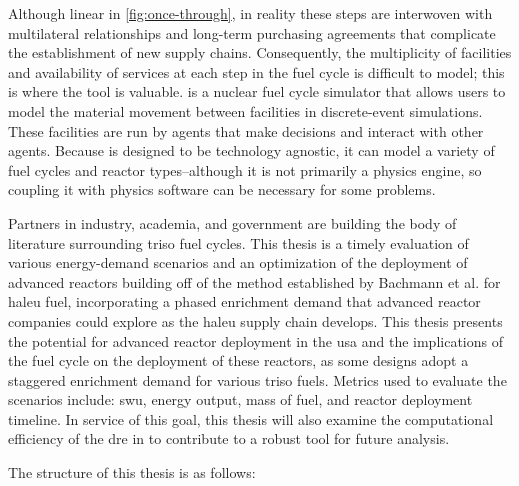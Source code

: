 
Although linear in \ref{fig:once-through}, in reality these steps are
interwoven with multilateral relationships and long-term purchasing agreements
that complicate the establishment of new supply chains. Consequently, the
multiplicity of facilities and availability of services at each step in the
fuel cycle is difficult to model; this is where the \cyclus
\cite{huff_cyclus_intro_2016} tool is valuable. \cyclus is a nuclear fuel cycle
simulator that allows users to model the material movement between facilities
in discrete-event simulations. These facilities are run by agents that make
decisions and interact with other agents. Because \cyclus is designed to be
technology agnostic, it can model a variety of fuel cycles and reactor
types--although it is not primarily a physics engine, so coupling it with
physics software can be necessary for some problems.

Partners in industry, academia, and government are building the body of
literature surrounding \gls{triso} fuel cycles. This thesis is a timely
evaluation of various energy-demand scenarios and an optimization of the
deployment of advanced reactors building off of the method established by
Bachmann et al. \cite{bachmann_enrichment_2021} for \gls{haleu} fuel,
incorporating a phased enrichment demand that advanced reactor companies could
explore as the \gls{haleu} supply chain develops. This thesis presents the
potential for advanced reactor deployment in the \gls{usa} and the implications
of the fuel cycle on the deployment of these reactors, as some designs adopt a
staggered enrichment demand for various \gls{triso} fuels. Metrics used to
evaluate the scenarios include: \gls{swu}, energy output, mass of fuel, and
reactor deployment timeline. In service of this goal, this thesis will also
examine the computational efficiency of the \gls{dre} in \cyclus to contribute
to a robust tool for future analysis.


The structure of this thesis is as follows:

